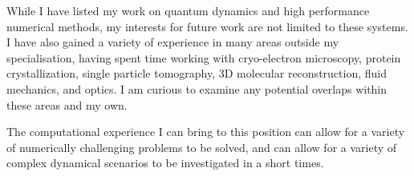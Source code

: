 \documentclass[12pt,a4paper,unicode]{moderncv}
\begin{document}
{    %

    While I have listed my work on quantum dynamics and high performance numerical methods, my interests for future work are not limited to these systems. I have also gained a variety of experience in many areas outside my specialisation, having spent time working with cryo-electron microscopy, protein crystallization, single particle tomography, 3D molecular reconstruction, fluid mechanics, and optics. I am curious to examine any potential overlaps within these areas and my own.

    The computational experience I can bring to this position can allow for a variety of numerically challenging problems to be solved, and can allow for a variety of complex dynamical scenarios to be investigated in a short times.
}

\makeletterclosing
\end{document}
